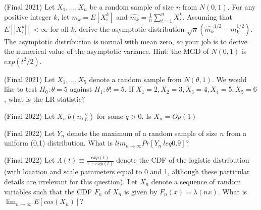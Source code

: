 \documentclass[answers]{exam}
\begin{document}
\begin{questions}

\question (Final 2021) Let $X_1,...,X_n$ be a random sample of size $n$ from $N(0,1)$. For any positive integer $k$, let $m_k = E[X_i^k]$ and $\hat{m_k} = \frac{1}{n} \sum_{i=1}^n X_i^k$. Assuming that $E[|X_i^k|] < \infty$ for all $k$, derive the asymptotic distribution $\sqrt{n}(\hat{m_k}^{1/2} - m_k^{1/2})$. The asymptotic distribution is normal with mean zero, so your job is to derive the numerical value of the asymptotic variance. Hint: the MGD of $N(0,1)$ is $exp(t^2/2)$.
\begin{solution}
\end{solution}

\question (Final 2021) Let $X_1,...,X_5$ denote a random sample from $N(\theta,1)$. We would like to test $H_0 : \theta = 5$ against $H_1 : \theta != 5$. If $X_1=2, X_2=3, X_3=4, X_4=5, X_5=6$, what is the LR statistic?
\begin{solution}
\end{solution}

\question (Final 2022) Let $X_n ~ b(n,\frac{q}{n})$ for some $q>0$. Is $X_n = Op(1)$
\begin{solution}
\end{solution}

\question (Final 2022) Let $Y_n$ denote the maximum of a random sample of size $n$ from a uniform (0,1) distribution. What is $lim_{n \to \infty} Pr[Y_n \ leq 0.9]$?
\begin{solution}
\end{solution}

\question (Final 2022) Let $\Lambda(t) \equiv \frac{exp(t)}{1+exp(t)}$ denote the CDF of the logistic distribution (with location and scale parameters equal to 0 and 1, although these particular details are irrelevant for this question). Let $X_n$ denote a sequence of random variables such that the CDF $F_n$ of $X_n$ is given by $F_n(x) = \lambda(nx)$. What is $\lim_{n \to \infty} E[cos(X_n)]$?
\begin{solution}
\end{solution}


\end{questions}
\end{document}
